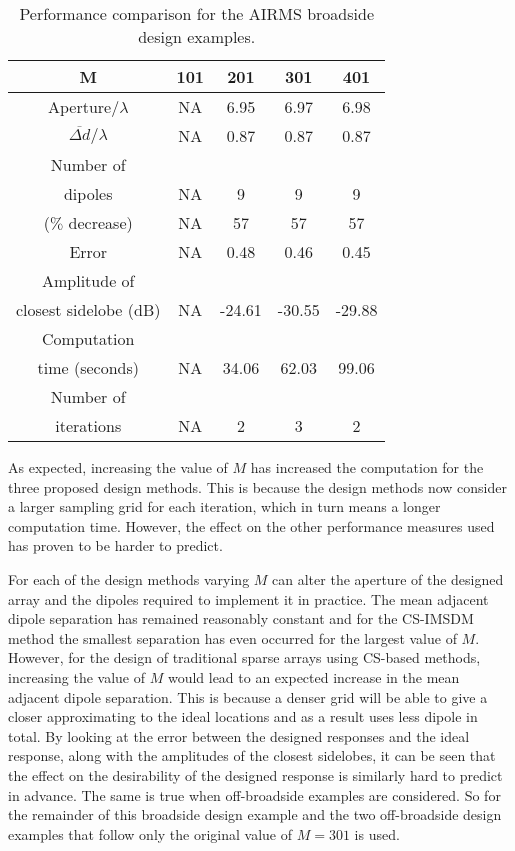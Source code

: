 \documentclass[10pt,final]{IEEEtran}
\begin{document}
\begin{table}
\caption{\rm Performance comparison for the AIRMS broadside design examples.} \centering
\begin{tabular}{|c|c|c|c|c|}
  \hline
  M & 101 & 201 & 301 & 401 \\
  \hline
  Aperture/$\lambda$ & NA & 6.95 & 6.97 & 6.98\\
  $\overline{\Delta{d}}/\lambda$ & NA & 0.87 & 0.87& 0.87\\
  \hline
  Number of &  &  & & \\
  dipoles & NA & 9 & 9 &9\\
  ($\%$ decrease) & NA & 57 &57 & 57\\
  \hline
  Error & NA & 0.48 & 0.46& 0.45\\
  \hline
  Amplitude of &  &  & & \\
  closest sidelobe (dB)& NA & -24.61 & -30.55 &-29.88\\
  \hline
  Computation &  &  &  &\\
  time (seconds) & NA & 34.06 & 62.03 &99.06\\
  \hline
  Number of &  &  & & \\
  iterations & NA & 2 & 3 & 2\\
  \hline
\end{tabular}
\label{tb:broadre}
\end{table}

As expected, increasing the value of $M$ has increased the computation for the three proposed design methods.
  This is because the design methods now consider a larger sampling grid for each iteration, which in turn
  means a longer computation time.  However, the effect on the other performance measures used has proven
  to be harder to predict.

For each of the design methods varying $M$ can alter the aperture of the designed array and the dipoles
required to implement it in practice.  The mean adjacent dipole separation has remained reasonably constant
and for the CS-IMSDM method the smallest separation has even occurred for the largest value of $M$. However,
for the design of traditional sparse arrays using CS-based methods, increasing the value of $M$ would lead
to an expected increase in the mean adjacent dipole separation.  This is because a denser grid will be able
to give a closer approximating to the ideal locations and as a result uses less dipole in total.  By looking
at the error between the designed responses and the ideal response, along with the amplitudes of the closest
sidelobes, it can be seen that the effect on the desirability of the designed response is similarly hard to
predict in advance.  The same is true when off-broadside examples are considered.  So for the remainder of this broadside design example and the two off-broadside design examples that follow only the original value of $M=301$ is used.
\end{document}
